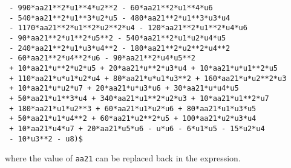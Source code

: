 \begin{verbatim}
 - 990*aa21**2*u1**4*u2**2 - 60*aa21**2*u1**4*u6
 - 540*aa21**2*u1**3*u2*u5 - 480*aa21**2*u1**3*u3*u4
 - 1170*aa21**2*u1**2*u2**2*u4 - 120*aa21**2*u1**2*u4*u6
 - 90*aa21**2*u1**2*u5**2 - 540*aa21**2*u1*u2*u4*u5
 - 240*aa21**2*u1*u3*u4**2 - 180*aa21**2*u2**2*u4**2
 - 60*aa21**2*u4**2*u6 - 90*aa21**2*u4*u5**2
 + 10*aa21*u**2*u2*u5 + 20*aa21*u**2*u3*u4 + 10*aa21*u*u1**2*u5
 + 110*aa21*u*u1*u2*u4 + 80*aa21*u*u1*u3**2 + 160*aa21*u*u2**2*u3
 + 10*aa21*u*u2*u7 + 20*aa21*u*u3*u6 + 30*aa21*u*u4*u5
 + 50*aa21*u1**3*u4 + 340*aa21*u1**2*u2*u3 + 10*aa21*u1**2*u7
 + 180*aa21*u1*u2**3 + 60*aa21*u1*u2*u6 + 80*aa21*u1*u3*u5
 + 50*aa21*u1*u4**2 + 60*aa21*u2**2*u5 + 100*aa21*u2*u3*u4
 + 10*aa21*u4*u7 + 20*aa21*u5*u6 - u*u6 - 6*u1*u5 - 15*u2*u4
 - 10*u3**2 - u8)$
\end{verbatim}
where the value of \texttt{aa21} can be replaced back in the expression.


